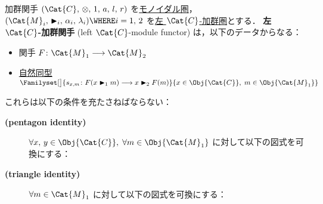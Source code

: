 \documentclass[TQFT_main]{subfiles}
\begin{document}
\begin{mydef}[label=def:module-functor,breakable]{加群関手}
    $(\Cat{C},\, \otimes,\, 1,\, a,\, l,\, r)$ を\hyperref[redef:monoidal-category]{モノイダル圏}，$(\Cat{M}_i,\, \btr_i,\, \alpha_i,\, \lambda_i) \WHERE i =1,\, 2$ を\hyperref[def:modulecat]{左 $\Cat{C}$-加群圏}とする．
    \textbf{左 $\Cat{C}$-加群関手} (left $\Cat{C}$-module functor) は，以下のデータからなる：
    \begin{itemize}
        \item 関手 $F \colon \Cat{M}_1 \lto \Cat{M}_2$
        \item \hyperref[def:nat]{自然同型} $\Familyset[\big]{s_{x,m} \colon F(x \btr_1 m) \lto x \btr_2 F(m)}{x \in \Obj{\Cat{C}},\; m \in \Obj{\Cat{M}_1}}$
    \end{itemize}
    これらは以下の条件を充たさねばならない：
    \begin{description}
        \item[\textbf{(pentagon identity)}] $\forall x,\, y \in \Obj{\Cat{C}},\; \forall m \in \Obj{\Cat{M}_1}$ に対して以下の図式を可換にする：
        \begin{flushleft}
        \end{flushleft}
        
        \item[\textbf{(triangle identity)}] $\forall m \in \Cat{M}_1$ に対して以下の図式を可換にする：
        \begin{center}
        \end{center}
    \end{description}
    
\end{mydef}
\end{document}
